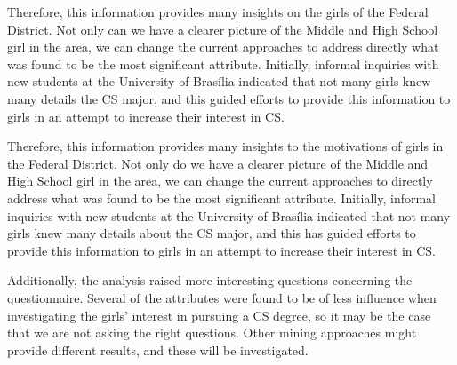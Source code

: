 Therefore, this information provides many insights on the girls of the Federal District. Not only can we have a clearer picture of the Middle and High School girl in the area, we can change the current approaches to address directly what was found to be the most significant attribute. Initially, informal inquiries with new students at the University of Brasília indicated that not many girls knew many details the CS major, and this guided efforts to provide this information to girls in an attempt to increase their interest in CS.

Therefore, this information provides many insights to the motivations of girls in the Federal District. Not only do we have a clearer picture of the Middle and High School girl in the area, we can change the current approaches to directly address what was found to be the most significant attribute. Initially, informal inquiries with new students at the University of Brasília indicated that not many girls knew many details about the CS major, and this has guided efforts to provide this information to girls in an attempt to increase their interest in CS.

Additionally, the analysis raised more interesting questions concerning the questionnaire. Several of the attributes were found to be of less influence when investigating the girls' interest in pursuing a CS degree, so it may be the case that we are not asking the right questions. Other mining approaches might provide different results, and these will be investigated.



